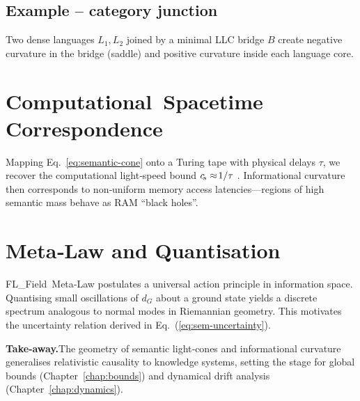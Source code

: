 \subsection*{Example – category junction}
Two dense languages $L_1,L_2$ joined by a minimal LLC bridge $B$ create
negative curvature in the bridge (saddle) and positive curvature inside
each language core.

\section{Computational Spacetime Correspondence}\label{sec:comp-spacetime}

Mapping Eq.~\eqref{eq:semantic-cone} onto a Turing tape with physical
delays $\tau$, we recover the computational light‑speed bound
$c_{\!s}\approx\!1/\tau$ \cite{compSpacetime}.  Informational curvature then
corresponds to non‑uniform memory access latencies—regions of high
semantic mass behave as RAM “black holes”.

\section{Meta‑Law and Quantisation}\label{sec:metalaw}

FL\_Field Meta‑Law postulates a universal action principle in
information space.  Quantising small oscillations of $d_G$ about a
ground state yields a discrete spectrum analogous to normal modes in
Riemannian geometry.  This motivates the uncertainty relation derived in
Eq.~(\ref{eq:sem-uncertainty}).

\bigskip\noindent\textbf{Take‑away.}\;The geometry of semantic light‑cones and
informational curvature generalises relativistic causality to knowledge
systems, setting the stage for global bounds (Chapter~\ref{chap:bounds})
and dynamical drift analysis (Chapter~\ref{chap:dynamics}).

\clearpage
